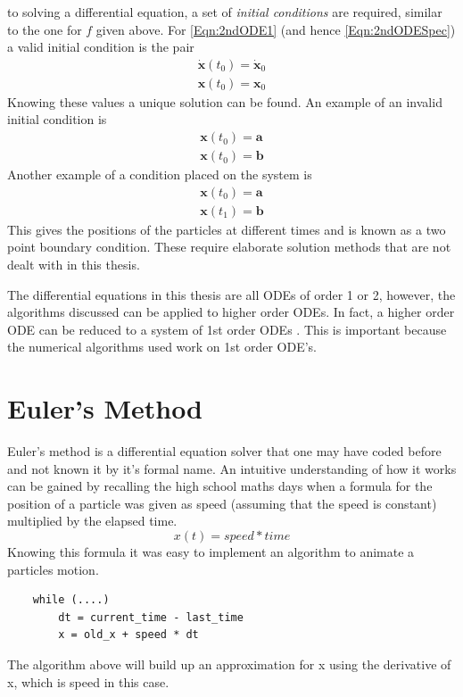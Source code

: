 to solving a differential equation, a set of \textit{initial conditions} are
required, similar to the one for $f$ given above. For \ref{Eqn:2ndODE1} (and hence
\ref{Eqn:2ndODESpec}) a valid initial condition is the pair
\begin{eqnarray*}
    \dot{\mathbf{x}}(t_0) = \dot{\mathbf{x}}_0\\
    \mathbf{x}(t_0) = \mathbf{x}_0
\end{eqnarray*}
Knowing these values a unique solution can be found.
An example of an invalid initial condition is
\begin{eqnarray*}
    \mathbf{x}(t_0) = \mathbf{a}\\
    \mathbf{x}(t_0) = \mathbf{b}
\end{eqnarray*}
Another example of a condition placed on the system is 
\begin{eqnarray*}
    \mathbf{x}(t_0) = \mathbf{a}\\
    \mathbf{x}(t_1) = \mathbf{b}
\end{eqnarray*}
This gives the positions of the particles at different times and is known as a
two point boundary condition. These require elaborate solution methods that are
not dealt with in this thesis.

The differential equations in this thesis are all ODEs of order
1 or 2, however, the algorithms discussed can be applied to higher order ODEs.
In fact, a higher order ODE can be reduced to a system of 1st order ODEs
\cite[pg 208]{NagleSaff}. This is important because the numerical
algorithms used work on 1st order ODE's.

\section{Euler's Method}
\label{sec:EulerMethod}
Euler's method is a differential equation solver that one may have coded before
and not known it by it's formal name. An intuitive understanding of how it works
can be gained by recalling the high school maths days when a formula for the
position of a particle was given as speed (assuming that the speed is constant)
multiplied by the elapsed time.
\[
    x(t) = speed * time 
\]
Knowing this formula it was easy to implement an algorithm to animate a
particles motion.
\begin{verbatim}
    while (....)     
        dt = current_time - last_time
        x = old_x + speed * dt        
\end{verbatim}
The algorithm above will build up an approximation for x using the
derivative of x, which is speed in this case. 

